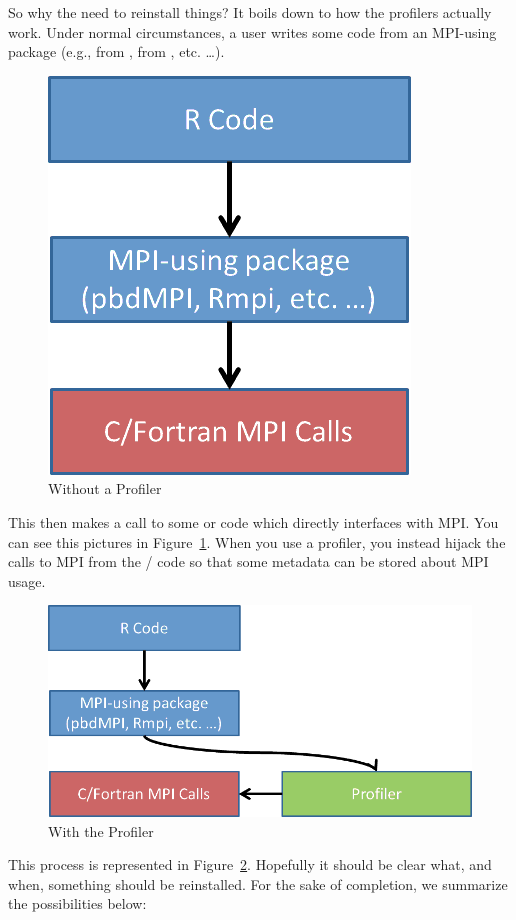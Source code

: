 So why the need to reinstall things?  It boils down to how the profilers 
actually work.  Under normal circumstances, a user writes some  code 
from an MPI-using package (e.g.,  from , 
 from , etc. \dots).
\begin{figure}[h]
  \centering
  \includegraphics[scale=.4]{include/pics/mpi_normal}
  \caption{Without a Profiler}
  \label{fig:normalmpi}
\end{figure}
This then makes a call to some  or  code which 
directly interfaces with MPI.  You can see this pictures in 
Figure~\ref{fig:normalmpi}.  When you use a profiler, you instead hijack the 
calls to MPI from the / code so that some 
metadata can be stored about MPI usage.
\begin{figure}[h]
  \hspace*{6.1cm}\includegraphics[scale=.4]{include/pics/mpi_profiler}
  \caption{With the Profiler}
  \label{fig:profmpi}
\end{figure}
This process is represented in Figure~\ref{fig:profmpi}.  Hopefully it should 
be clear what, and when, something should be reinstalled.  For the sake of 
completion, we summarize the possibilities below:

